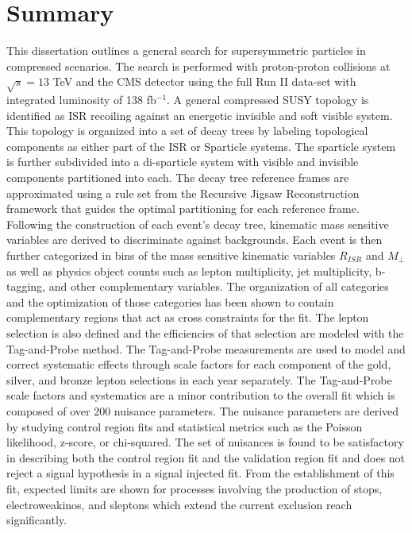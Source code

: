 \setcounter{secnumdepth}{3}
\setcounter{tocdepth}{3}
\setlength{\parskip}{\smallskipamount}
\setlength{\parindent}{0pt}


\makeatletter


\providecommand{\tabularnewline}{\\}


\makeatother


\chapter{Summary}


This dissertation outlines a general search for supersymmetric particles in compressed scenarios. The search is performed with proton-proton collisions at $\sqrt{s} = 13$ TeV and the CMS detector using the full Run II data-set with integrated luminosity of 138 fb$^{-1}$. A general compressed SUSY topology is identified as ISR recoiling against an energetic invisible and soft visible system. This topology is organized into a set of decay trees by labeling topological components as either part of the ISR or Sparticle systems. The sparticle system is further subdivided into a di-sparticle system with visible and invisible components partitioned into each. The decay tree reference frames are approximated using a rule set from the Recursive Jigsaw Reconstruction framework that guides the optimal partitioning for each reference frame. Following the construction of each event's decay tree, kinematic mass sensitive variables are derived to discriminate against backgrounds. Each event is then further categorized in bins of the mass sensitive kinematic variables $R_{ISR}$ and $M_\perp$ as well as physics object counts such as lepton multiplicity, jet multiplicity, b-tagging, and other complementary variables. The organization of all categories and the optimization of those categories has been shown to contain complementary regions that act as cross constraints for the fit. The lepton selection is also defined and the efficiencies of that selection are modeled with the Tag-and-Probe method. The Tag-and-Probe measurements are used to  model and correct systematic effects through scale factors for each component of the gold, silver, and bronze lepton selections in each year separately. The Tag-and-Probe scale factors and systematics are a minor contribution to the overall fit which is composed of over 200 nuisance parameters. The nuisance parameters are derived by studying control region fits and statistical metrics such as the Poisson likelihood, z-score, or chi-squared. The set of nuisances is found to be satisfactory in describing both the control region fit and the validation region fit and does not reject a signal hypothesis in a signal injected fit. From the establishment of this fit, expected limits are shown for processes involving the production of stops, electroweakinos, and sleptons which extend the current exclusion reach significantly.   

